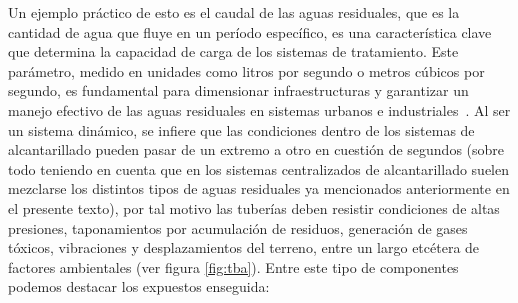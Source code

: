 Un ejemplo práctico de esto es el caudal de las aguas residuales, que es la cantidad de agua que fluye en un período específico, es una característica clave que determina la capacidad de carga de los sistemas de tratamiento. Este parámetro, medido en unidades como litros por segundo o metros cúbicos por segundo, es fundamental para dimensionar infraestructuras y garantizar un manejo efectivo de las aguas residuales en sistemas urbanos e industriales~\citep{crites2000}. Al ser un sistema dinámico, se infiere que las condiciones dentro de los sistemas de alcantarillado pueden pasar de un extremo a otro en cuestión de segundos (sobre todo teniendo en cuenta que en los sistemas centralizados de alcantarillado suelen mezclarse los distintos tipos de aguas residuales ya mencionados anteriormente en el presente texto), por tal motivo las tuberías deben resistir condiciones de altas presiones, taponamientos por acumulación de residuos, generación de gases tóxicos, vibraciones y desplazamientos del terreno, entre un largo etcétera de factores ambientales (ver figura \ref{fig:tba}).
Entre este tipo de componentes podemos destacar los expuestos enseguida:
